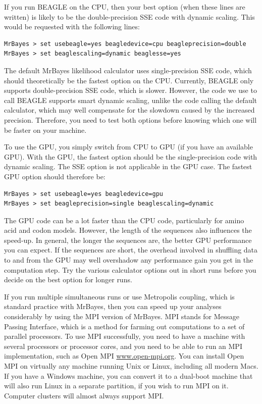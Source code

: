 \documentclass[12pt]{book}
\begin{document}
If you run BEAGLE on the CPU, then your best option (when these lines are written) is likely to be
the double-precision SSE code with dynamic scaling. This would be requested with the following
lines:

\small
\begin{verbatim}
MrBayes > set usebeagle=yes beagledevice=cpu beagleprecision=double
MrBayes > set beaglescaling=dynamic beaglesse=yes
\end{verbatim}
\normalsize

The default MrBayes likelihood calculator uses single-precision SSE code, which should
theoretically be the fastest option on the CPU. Currently, BEAGLE only supports double-precision
SSE code, which is slower. However, the code we use to call BEAGLE supports smart dynamic scaling,
unlike the code calling the default calculator, which may well compensate for the slowdown caused
by the increased precision. Therefore, you need to test both options before knowing which one will
be faster on your machine.

To use the GPU, you simply switch from CPU to GPU (if you have an available GPU). With the GPU, the
fastest option should be the single-precision code with dynamic scaling. The SSE option is not
applicable in the GPU case. The fastest GPU option should therefore be:

\small
\begin{verbatim}
MrBayes > set usebeagle=yes beagledevice=gpu
MrBayes > set beagleprecision=single beaglescaling=dynamic
\end{verbatim}
\normalsize

The GPU code can be a lot faster than the CPU code, particularly for amino acid and codon models.
However, the length of the sequences also influences the speed-up. In general, the longer the
sequences are, the better GPU performance you can expect. If the sequences are short, the overhead
involved in shuffling data to and from the GPU may well overshadow any performance gain you get in
the computation step. Try the various calculator options out in short runs before you decide on the
best option for longer runs.

If you run multiple simultaneous runs or use Metropolis coupling, which is standard practice with
MrBayes, then you can speed up your analyses considerably by using the MPI version of MrBayes. MPI
stands for Message Passing Interface, which is a method for farming out computations to a set of
parallel processors. To use MPI successfully, you need to have a machine with several processors
or processor cores, and you need to be able to run an MPI implementation, such as Open MPI
\url{www.open-mpi.org}. You can install Open MPI on virtually any machine running Unix or Linux,
including all modern Macs. If you have a Windows machine, you can convert it to a dual-boot machine
that will also run Linux in a separate partition, if you wish to run MPI on it. Computer clusters
will almost always support MPI.
\end{document}

